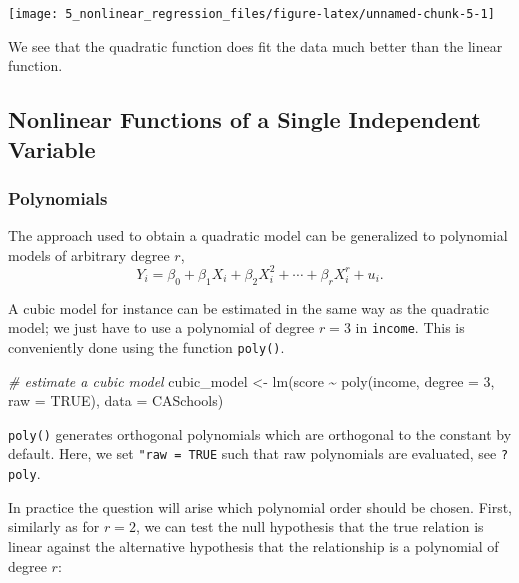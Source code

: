 \documentclass[
]{article}
\newenvironment{Shaded}{\begin{snugshade}}{\end{snugshade}}
\newcommand{\AttributeTok}[1]{\textcolor[rgb]{0.77,0.63,0.00}{#1}}
\newcommand{\CommentTok}[1]{\textcolor[rgb]{0.56,0.35,0.01}{\textit{#1}}}
\newcommand{\ConstantTok}[1]{\textcolor[rgb]{0.00,0.00,0.00}{#1}}
\newcommand{\DecValTok}[1]{\textcolor[rgb]{0.00,0.00,0.81}{#1}}
\newcommand{\FunctionTok}[1]{\textcolor[rgb]{0.00,0.00,0.00}{#1}}
\newcommand{\NormalTok}[1]{#1}
\newcommand{\OtherTok}[1]{\textcolor[rgb]{0.56,0.35,0.01}{#1}}
\newcommand{\SpecialCharTok}[1]{\textcolor[rgb]{0.00,0.00,0.00}{#1}}
\begin{document}
\begin{center}\texttt{[image: 5\_nonlinear\_regression\_files/figure-latex/unnamed-chunk-5-1]} \end{center}

We see that the quadratic function does fit the data much better than
the linear function.

\hypertarget{nfoasiv}{%
\subsection{Nonlinear Functions of a Single Independent
Variable}\label{nfoasiv}}

\hypertarget{polynomials}{%
\subsubsection*{Polynomials}\label{polynomials}}

The approach used to obtain a quadratic model can be generalized to
polynomial models of arbitrary degree \(r\),
\[Y_i = \beta_0 + \beta_1 X_i + \beta_2 X_i^2 + \cdots + \beta_r X_i^r + u_i.\]

A cubic model for instance can be estimated in the same way as the
quadratic model; we just have to use a polynomial of degree \(r=3\) in
\texttt{income}. This is conveniently done using the function
\texttt{poly()}.

\begin{Shaded}
\begin{Highlighting}[]
\CommentTok{\# estimate a cubic model}
\NormalTok{cubic\_model }\OtherTok{\textless{}{-}} \FunctionTok{lm}\NormalTok{(score }\SpecialCharTok{\textasciitilde{}} \FunctionTok{poly}\NormalTok{(income, }\AttributeTok{degree =} \DecValTok{3}\NormalTok{, }\AttributeTok{raw =} \ConstantTok{TRUE}\NormalTok{), }\AttributeTok{data =}\NormalTok{ CASchools)}
\end{Highlighting}
\end{Shaded}

\texttt{poly()} generates orthogonal polynomials which are orthogonal to
the constant by default. Here, we set \texttt{"raw\ =\ TRUE} such that
raw polynomials are evaluated, see \texttt{?poly}.

In practice the question will arise which polynomial order should be
chosen. First, similarly as for \(r=2\), we can test the null hypothesis
that the true relation is linear against the alternative hypothesis that
the relationship is a polynomial of degree \(r\):
\end{document}
